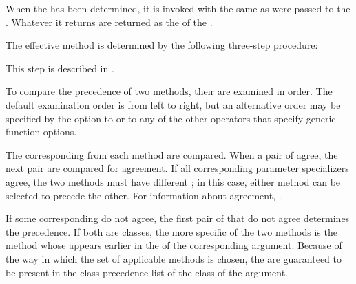 When the  has been determined,
it is invoked with the same  as were passed to the .  
Whatever  it returns are returned as the 
of the .


The effective method is determined by the following three-step procedure:

\beginlist




\endlist


This step is described in \secref\IntroToMethods.

\endsubsubsubsection%


To compare the precedence of two methods, their 
are examined in order.  The default examination order is from left to
right, but an alternative order may be specified by the 
 option to  or to any of
the other operators that specify generic function options.

The corresponding  from each method are
compared.  When a pair of  agree, the next
pair are compared for agreement.  If all corresponding parameter
specializers agree, the two methods must have different
; in this case, either method can be selected to precede the
other.  For information about agreement, \seesection\SpecializerQualifierAgreement.

If some corresponding  do not agree, the first
pair of  that do not agree determines the
precedence.  If both  are classes, the more
specific of the two methods is the method whose 
appears earlier in the  of the corresponding
argument.  Because of the way in which the set of applicable methods
is chosen, the  are guaranteed to be present in
the class precedence list of the class of the argument.

